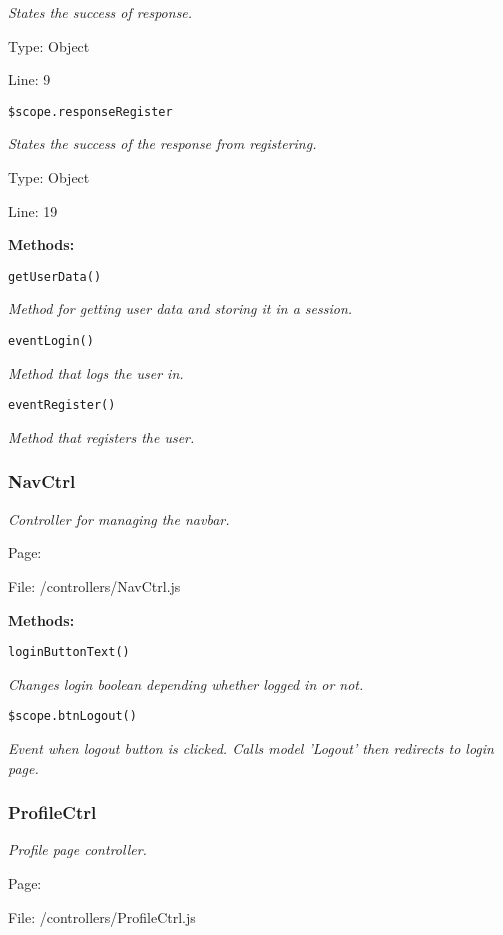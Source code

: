 {\scriptsize
\textit{States the success of response.}

Type: Object

Line: 9

}
\texttt{\$scope.responseRegister}

{\scriptsize
\textit{States the success of the response from registering.}

Type: Object

Line: 19

}
\textbf{Methods:}

\texttt{getUserData()}

{\scriptsize
\textit{Method for getting user data and storing it in a session.}

}

\texttt{eventLogin()}

{\scriptsize
\textit{Method that logs the user in.}

}

\texttt{eventRegister()}

{\scriptsize
\textit{Method that registers the user.}

}

\subsubsection{NavCtrl}\label{NavCtrl.js.doc}
\textit{Controller for managing the navbar.}

Page: \pageref{NavCtrl.js}

File: /controllers/NavCtrl.js

\textbf{Methods:}

\texttt{loginButtonText()}

{\scriptsize
\textit{Changes login boolean depending whether logged in or not.}

}

\texttt{\$scope.btnLogout()}

{\scriptsize
\textit{Event when logout button is clicked.
Calls model 'Logout' then redirects to login page.}

}

\subsubsection{ProfileCtrl}\label{ProfileCtrl.js.doc}
\textit{Profile page controller.}

Page: \pageref{ProfileCtrl.js}

File: /controllers/ProfileCtrl.js

